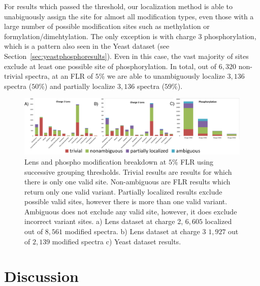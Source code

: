 \documentclass[11pt]{article}
\begin{document}
{For results which passed the threshold, our localization method is able to unabiguously assign the site for almost all modification types, even those with a large number of possible modification sites such as methylation or formylation/dimehtylation. The only exception is with charge 3 phosphorylation, which is a pattern also seen in the Yeast dataset (see Section~\ref{sec:yeastphosphoresults}). Even in this case, the vast majority of sites exclude at least one possible site of phosphorylation. In total, out of $6,320$ non-trivial spectra, at an FLR of $5\%$ we are able to unambiguously localize $3,136$ spectra ($50\%$) and partially localize $3,136$ spectra ($59\%$).

\begin{figure}[h!]
\centering %
\includegraphics[scale=.8]{fig/lens_and_phospho_histogram.png}
\caption{Lens and phospho modification breakdown at $5\%$ FLR using successive grouping thresholds. Trivial results are results for which there is only one valid site. Non-ambiguous are FLR results which return only one valid variant. Partially localized results exclude possible valid sites, however there is more than one valid variant. Ambiguous does not exclude any valid site, however, it does exclude incorrect variant sites. a) Lens dataset at charge 2, $6,605$ localized out of $8,561$ modified spectra. b) Lens dataset at charge 3 $1,927$ out of $2,139$ modified spectra c) Yeast dataset results. }
\label{fig:modBreakdown}
\end{figure}

\section{Discussion}

}
\end{document}
